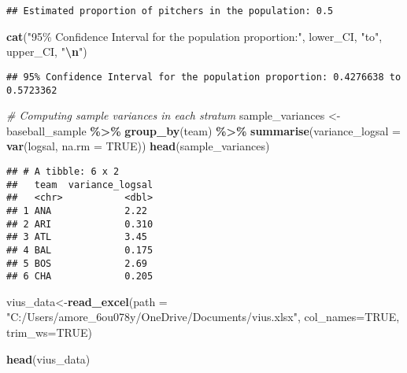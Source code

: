 \documentclass[
]{article}
\newenvironment{Shaded}{\begin{snugshade}}{\end{snugshade}}
\newcommand{\AttributeTok}[1]{\textcolor[rgb]{0.13,0.29,0.53}{#1}}
\newcommand{\CommentTok}[1]{\textcolor[rgb]{0.56,0.35,0.01}{\textit{#1}}}
\newcommand{\ConstantTok}[1]{\textcolor[rgb]{0.56,0.35,0.01}{#1}}
\newcommand{\FunctionTok}[1]{\textcolor[rgb]{0.13,0.29,0.53}{\textbf{#1}}}
\newcommand{\NormalTok}[1]{#1}
\newcommand{\OtherTok}[1]{\textcolor[rgb]{0.56,0.35,0.01}{#1}}
\newcommand{\SpecialCharTok}[1]{\textcolor[rgb]{0.81,0.36,0.00}{\textbf{#1}}}
\newcommand{\StringTok}[1]{\textcolor[rgb]{0.31,0.60,0.02}{#1}}
\begin{document}
\begin{verbatim}
## Estimated proportion of pitchers in the population: 0.5
\end{verbatim}

\begin{Shaded}
\begin{Highlighting}[]
\FunctionTok{cat}\NormalTok{(}\StringTok{"95\% Confidence Interval for the population proportion:"}\NormalTok{, lower\_CI, }\StringTok{"to"}\NormalTok{, upper\_CI, }\StringTok{"}\SpecialCharTok{\textbackslash{}n}\StringTok{"}\NormalTok{)}
\end{Highlighting}
\end{Shaded}

\begin{verbatim}
## 95% Confidence Interval for the population proportion: 0.4276638 to 0.5723362
\end{verbatim}

\begin{Shaded}
\begin{Highlighting}[]
\CommentTok{\# Computing sample variances in each stratum}
\NormalTok{sample\_variances }\OtherTok{\textless{}{-}}\NormalTok{ baseball\_sample }\SpecialCharTok{\%\textgreater{}\%}
  \FunctionTok{group\_by}\NormalTok{(team) }\SpecialCharTok{\%\textgreater{}\%}
  \FunctionTok{summarise}\NormalTok{(}\AttributeTok{variance\_logsal =} \FunctionTok{var}\NormalTok{(logsal, }\AttributeTok{na.rm =} \ConstantTok{TRUE}\NormalTok{))}
\FunctionTok{head}\NormalTok{(sample\_variances)}
\end{Highlighting}
\end{Shaded}

\begin{verbatim}
## # A tibble: 6 x 2
##   team  variance_logsal
##   <chr>           <dbl>
## 1 ANA             2.22 
## 2 ARI             0.310
## 3 ATL             3.45 
## 4 BAL             0.175
## 5 BOS             2.69 
## 6 CHA             0.205
\end{verbatim}

\begin{Shaded}
\begin{Highlighting}[]
\NormalTok{vius\_data}\OtherTok{\textless{}{-}}\FunctionTok{read\_excel}\NormalTok{(}\AttributeTok{path =} \StringTok{"C:/Users/amore\_6ou078y/OneDrive/Documents/vius.xlsx"}\NormalTok{, }
                         \AttributeTok{col\_names=}\ConstantTok{TRUE}\NormalTok{,}
                         \AttributeTok{trim\_ws=}\ConstantTok{TRUE}\NormalTok{) }
                         
\FunctionTok{head}\NormalTok{(vius\_data)}
\end{Highlighting}
\end{Shaded}
\end{document}
